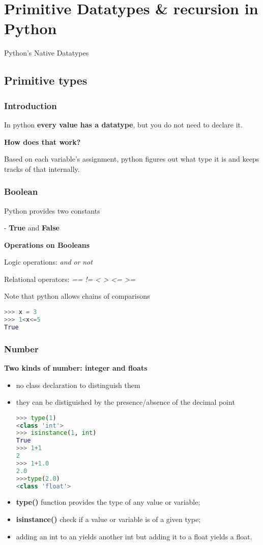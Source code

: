 \section{Primitive Datatypes \& recursion in Python}

Python's Native Datatypes

\subsection{Primitive types}

\subsubsection{Introduction}
In python \textbf{every value has a datatype}, but you do not need to declare it.

\textbf{How does that work?}

Based on each variable's assignment, python figures out what type it is and keeps tracks of that internally.

\subsubsection{Boolean}
Python provides two constants

- \textbf{True} and \textbf{False}

\textbf{Operations on Booleans}

Logic operations: \textit{and} \textit{or} \textit{not}

Relational operators: \textit{==} \textit{!=} \textit{<} \textit{>} \textit{<=} \textit{>=}

Note that python allows chains of comparisons
\begin{lstlisting}[language=Python]
>>> x = 3
>>> 1<x<=5
True
\end{lstlisting}

\subsubsection{Number}
\textbf{Two kinds of number: integer and floats}
\begin{itemize}
	\item no class declaration to distinguish them
	\item they can be distiguished by the presence/absence of the decimal point
\begin{lstlisting}[language=Python]
>>> type(1)
<class 'int'>
>>> isinstance(1, int)
True
>>> 1+1
2
>>> 1+1.0
2.0
>>>type(2.0)
<class 'float'>
\end{lstlisting}
	\item \textbf{type()} function provides the type of any value or variable;
	\item \textbf{isinstance()} check if a value or variable is of a given type;
	\item adding an int to an yields another int but adding it to a float yields a float.
\end{itemize}

